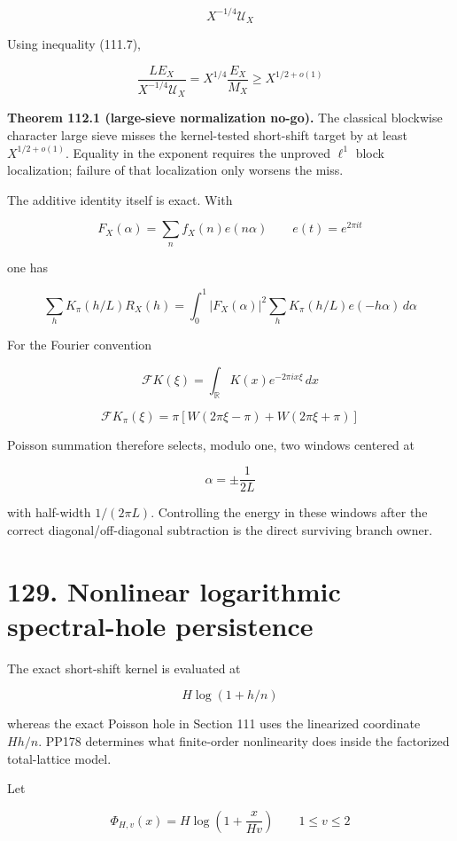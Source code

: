 \documentclass[
  11pt,
]{book}
\renewenvironment{quote}
  {\begin{tcolorbox}[
      enhanced,
      breakable,
      colback=tncream,
      colframe=tnrust,
      boxrule=0.8pt,
      arc=1.5pt,
      left=7pt,
      right=7pt,
      top=6pt,
      bottom=6pt]}
  {\end{tcolorbox}}
\begin{document}
\[
X^{-1/4}\mathcal U_X
\tag{112.8}
\]

Using inequality (111.7),

\[
\frac{LE_X}{X^{-1/4}\mathcal U_X}
=X^{1/4}\frac{E_X}{M_X}
\ge X^{1/2+o(1)}
\tag{112.9}
\]

\begin{quote}
\textbf{Theorem 112.1 (large-sieve normalization no-go).} The classical
blockwise character large sieve misses the kernel-tested short-shift
target by at least \(X^{1/2+o(1)}\). Equality in the exponent requires
the unproved \(\ell^1\) block localization; failure of that localization
only worsens the miss.
\end{quote}

The additive identity itself is exact. With

\[
F_X(\alpha)=\sum_nf_X(n)e(n\alpha)
\qquad e(t)=e^{2\pi it}
\tag{112.10}
\]

one has

\[
\boxed{
\sum_hK_\pi(h/L)R_X(h)
=\int_0^1|F_X(\alpha)|^2
\sum_hK_\pi(h/L)e(-h\alpha)\,d\alpha
}
\tag{112.11}
\]

For the Fourier convention

\[
\mathcal FK(\xi)=\int_{\mathbb R}K(x)e^{-2\pi ix\xi}\,dx
\tag{112.12}
\]

\[
\mathcal FK_\pi(\xi)
=\pi\left[
W(2\pi\xi-\pi)+W(2\pi\xi+\pi)
\right]
\tag{112.13}
\]

Poisson summation therefore selects, modulo one, two windows centered at

\[
\alpha=\pm\frac1{2L}
\tag{112.14}
\]

with half-width \(1/(2\pi L)\). Controlling the energy in these windows
after the correct diagonal/off-diagonal subtraction is the direct
surviving branch owner.

\section{129. Nonlinear logarithmic spectral-hole
persistence}\label{nonlinear-logarithmic-spectral-hole-persistence}

The exact short-shift kernel is evaluated at

\[
H\log(1+h/n)
\]

whereas the exact Poisson hole in Section 111 uses the linearized
coordinate \(Hh/n\). PP178 determines what finite-order nonlinearity
does inside the factorized total-lattice model.

Let

\[
\Phi_{H,v}(x)=H\log\left(1+\frac{x}{Hv}\right)
\qquad 1\le v\le2
\tag{129.1}
\]
\end{document}
